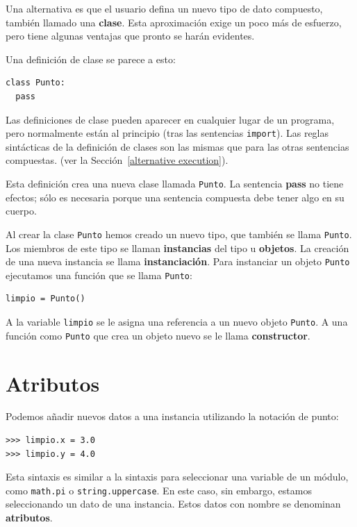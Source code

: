 
Una alternativa es que el usuario defina un nuevo tipo de dato compuesto, también
llamado una {\bf clase}. Esta aproximación exige un poco más de esfuerzo,
pero tiene algunas ventajas que pronto se harán evidentes.

Una definición de clase se parece a esto:

\beforeverb
\begin{verbatim}
class Punto:
  pass
\end{verbatim}
\afterverb
%
Las definiciones de clase pueden aparecer en cualquier lugar de un
programa, pero normalmente están al principio (tras las sentencias
\texttt{import}). Las reglas sintácticas de la definición de clases son
las mismas que para las otras sentencias compuestas. (ver la
Sección~\ref{alternative execution}).

Esta definición crea una nueva clase llamada \texttt{Punto}. La sentencia
{\bf pass} no tiene efectos; sólo es necesaria porque una sentencia
compuesta debe tener algo en su cuerpo.

Al crear la clase \texttt{Punto} hemos creado un nuevo tipo, que también
se llama \texttt{Punto}. Los miembros de este tipo se llaman {\bf instancias}
del tipo u {\bf objetos}. La creación de una nueva instancia se llama
{\bf instanciación}. Para instanciar un objeto \texttt{Punto} ejecutamos una
función que se llama \texttt{Punto}:


\beforeverb
\begin{verbatim}
limpio = Punto()
\end{verbatim}
\afterverb
%
A la variable \texttt{limpio} se le asigna una referencia a un nuevo
objeto \texttt{Punto}. A una función como \texttt{Punto} que crea un
objeto nuevo se le llama {\bf constructor}.


\section{Atributos}

Podemos añadir nuevos datos a una instancia utilizando la notación de punto:

\beforeverb
\begin{verbatim}
>>> limpio.x = 3.0
>>> limpio.y = 4.0
\end{verbatim}
\afterverb
%
Esta sintaxis es similar a la sintaxis para seleccionar una variable de
un módulo, como \texttt{math.pi} o \texttt{string.uppercase}. En este caso,
sin embargo, estamos seleccionando un dato de una instancia. Estos datos
con nombre se denominan {\bf atributos}.

